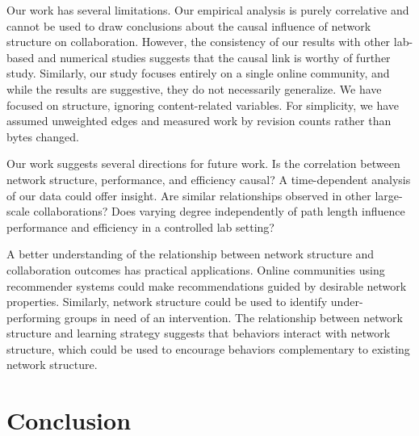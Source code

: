 Our work has several limitations.
Our empirical analysis is purely correlative and cannot be used to draw
conclusions about the causal influence of network structure on collaboration.
However, the consistency of our results with other lab-based and numerical studies
suggests that the causal link is worthy of further study.
Similarly, our study focuses entirely on a single online community,
and while the results are suggestive, they do not necessarily generalize.
We have focused on structure, ignoring content-related variables.
For simplicity, we have assumed unweighted edges and
measured work by revision counts rather than bytes changed.

Our work suggests several directions for future work.
Is the correlation between network structure, performance, and efficiency causal?
A time-dependent analysis of our data could offer insight.
Are similar relationships observed in other large-scale collaborations?
Does varying degree independently of path length influence
performance and efficiency in a controlled lab setting?

A better understanding of the relationship between network structure and collaboration
outcomes has practical applications.
Online communities using recommender systems could make recommendations guided by desirable network properties.
Similarly, network structure could be used to identify under-performing
groups in need of an intervention.
The relationship between network structure and learning strategy suggests that
behaviors interact with network structure,
which could be used to encourage behaviors complementary to existing network
structure.

\section{Conclusion}
\label{sec:conclusion}

